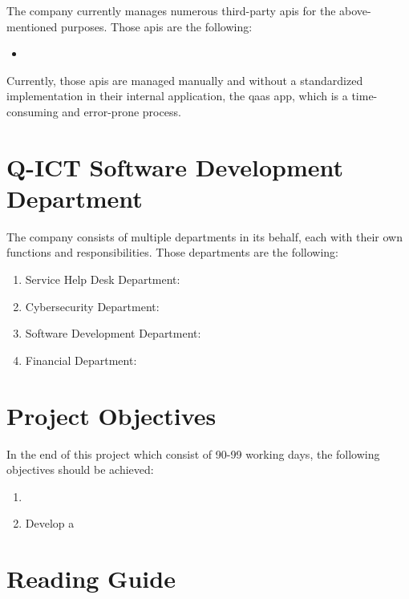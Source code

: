 \begin{multicols}{2}
    The company currently manages numerous third-party \acrshort{api}s for the above-mentioned purposes. Those
    \acrshort{api}s are the following:
    \begin{itemize}
        \item
    \end{itemize}
    Currently, those \acrshort{api}s are managed manually and without a standardized implementation in their
    internal application, the \acrshort{qaas} app, which is a time-consuming and error-prone process.
\end{multicols}
\section{Q-ICT Software Development Department}
\begin{multicols}{2}
    The company consists of multiple departments in its behalf, each with their own functions and responsibilities.
    Those departments are the following:
    \begin{enumerate}
        \item Service Help Desk Department:
        \item Cybersecurity Department:
        \item Software Development Department:
        \item Financial Department:
    \end{enumerate}
\end{multicols}
\section{Project Objectives}
In the end of this project which consist of 90-99 working days, the following objectives should be achieved:
\begin{enumerate}
    \item
    \item Develop a
\end{enumerate}
\section{Reading Guide}

